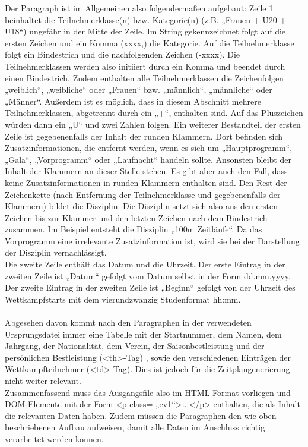 {Der Paragraph ist im Allgemeinen also folgendermaßen aufgebaut:
Zeile 1 beinhaltet die Teilnehmerklasse(n) bzw. Kategorie(n) (z.B. „Frauen + U20 + U18“) ungefähr in der Mitte der Zeile. Im String gekennzeichnet folgt auf die ersten Zeichen und ein Komma (xxxx,) die Kategorie. Auf die Teilnehmerklasse folgt ein Bindestrich und die nachfolgenden Zeichen (-xxxx). Die Teilnehmerklassen werden also initiiert durch ein Komma und beendet durch einen Bindestrich. Zudem enthalten alle Teilnehmerklassen die Zeichenfolgen „weiblich“, „weibliche“ oder „Frauen“ bzw. „männlich“, „männliche“ oder „Männer“. Außerdem ist es möglich, dass in diesem Abschnitt mehrere Teilnehmerklassen, abgetrennt durch ein „+“, enthalten sind. Auf das Pluszeichen würden dann ein „U“ und zwei Zahlen folgen. Ein weiterer Bestandteil der ersten Zeile ist gegebenenfalls der Inhalt der runden Klammern. Dort befinden sich Zusatzinformationen, die entfernt werden, wenn es sich um „Hauptprogramm“, „Gala“, „Vorprogramm“ oder „Laufnacht“ handeln sollte. Ansonsten bleibt der Inhalt der Klammern an dieser Stelle stehen. Es gibt aber auch den Fall, dass keine Zusatzinformationen in runden Klammern enthalten sind. Den Rest der Zeichenkette (nach Entfernung der Teilnehmerklasse und gegebenenfalls der Klammern) bildet die Disziplin. Die Disziplin setzt sich also aus den ersten Zeichen bis zur Klammer und den letzten Zeichen nach dem Bindestrich zusammen. Im Beispiel entsteht die Disziplin „100m Zeitläufe“. Da das Vorprogramm eine irrelevante Zusatzinformation ist, wird sie bei der Darstellung der Disziplin vernachlässigt.
\\
Die zweite Zeile enthält das Datum und die Uhrzeit. Der erste Eintrag in der zweiten Zeile ist „Datum“ gefolgt vom Datum selbst in der Form dd.mm.yyyy. Der zweite Eintrag in der zweiten Zeile ist „Beginn“ gefolgt von der Uhrzeit des Wettkampfstarts mit dem vierundzwanzig Studenformat hh:mm.\\
\\
Abgesehen davon kommt nach den Paragraphen in der verwendeten Ursprungsdatei immer eine Tabelle mit der Startnummer, dem Namen, dem Jahrgang, der Nationalität, dem Verein, der Saisonbestleistung und der persönlichen Bestleistung (<th>-Tag) , sowie den verschiedenen Einträgen der Wettkampfteilnehmer (<td>-Tag). Dies ist jedoch für die Zeitplangenerierung nicht weiter relevant.\\
Zusammenfassend muss das Ausgangsfile also im HTML-Format vorliegen und DOM-Elemente mit der Form <p class= „ev1“>...</p> enthalten, die als Inhalt die relevanten Daten haben. Zudem müssen die Paragraphen den wie oben beschriebenen Aufbau aufweisen, damit alle Daten im Anschluss richtig verarbeitet werden können. 

}
